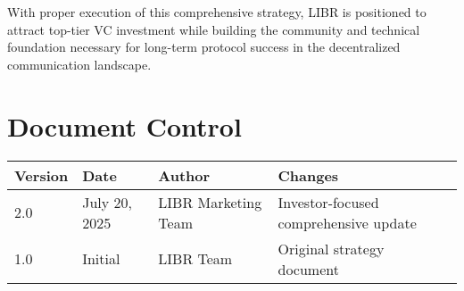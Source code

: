 \documentclass[12pt,a4paper]{article}
\begin{document}
With proper execution of this comprehensive strategy, LIBR is positioned to attract top-tier VC investment while building the community and technical foundation necessary for long-term protocol success in the decentralized communication landscape.

\vspace{1cm}

\section*{Document Control}
\begin{center}
\begin{tabular}{|l|l|l|l|}
\hline
\textbf{Version} & \textbf{Date} & \textbf{Author} & \textbf{Changes} \\
\hline
2.0 & July 20, 2025 & LIBR Marketing Team & Investor-focused comprehensive update \\
1.0 & Initial & LIBR Team & Original strategy document \\
\hline
\end{tabular}
\end{center}
\end{document}
